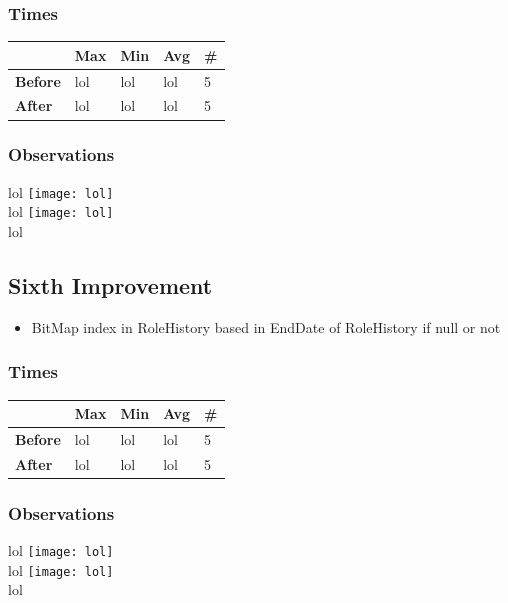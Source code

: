 \documentclass[a4paper, 10pt]{article}
\begin{document}
\subsubsection{Times}
\begin{table}[H]
\begin{tabular}{l|l|l|l|l|}
\cline{2-5}
\textbf{}                             & \textbf{Max} & \textbf{Min} & \textbf{Avg} & \textbf{\#}  \\ \hline
\multicolumn{1}{|l|}{\textbf{Before}} & lol         & lol         & lol          & 5            \\ \hline
\multicolumn{1}{|l|}{\textbf{After}}  & lol         & lol         & lol          & 5            \\ \hline
\end{tabular}
\end{table}
\subsubsection{Observations}
lol
\texttt{[image: lol]}\\ 
lol
\texttt{[image: lol]}\\
lol

\subsection{Sixth Improvement}
\begin{itemize}
  \item BitMap index in RoleHistory based in EndDate of RoleHistory if null or not
\end{itemize}
\subsubsection{Times}
\begin{table}[H]
\begin{tabular}{l|l|l|l|l|}
\cline{2-5}
\textbf{}                             & \textbf{Max} & \textbf{Min} & \textbf{Avg} & \textbf{\#}  \\ \hline
\multicolumn{1}{|l|}{\textbf{Before}} & lol         & lol         & lol          & 5            \\ \hline
\multicolumn{1}{|l|}{\textbf{After}}  & lol         & lol         & lol          & 5            \\ \hline
\end{tabular}
\end{table}
\subsubsection{Observations}
lol
\texttt{[image: lol]}\\ 
lol
\texttt{[image: lol]}\\
lol
\end{document}
